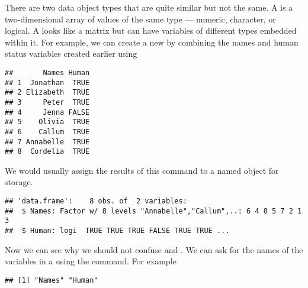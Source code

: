 There are two data object types that are quite similar but not the same. A  is a two-dimensional array of values of the same type --- numeric, character, or logical. A  looks like a matrix but can have variables of different types embedded within it. For example, we can create a new  by combining the names and human status variables created earlier using 
\begin{knitrout}
\color{fgcolor}\begin{kframe}
\begin{alltt}
\end{alltt}
\begin{verbatim}
##       Names Human
## 1  Jonathan  TRUE
## 2 Elizabeth  TRUE
## 3     Peter  TRUE
## 4     Jenna FALSE
## 5    Olivia  TRUE
## 6    Callum  TRUE
## 7 Annabelle  TRUE
## 8  Cordelia  TRUE
\end{verbatim}
\end{kframe}
\end{knitrout}
We would usually assign the results of this command to a named object for storage. 
\begin{knitrout}
\color{fgcolor}\begin{kframe}
\begin{alltt}
 \hlkwb{=} 
\end{alltt}
\begin{verbatim}
## 'data.frame':	8 obs. of  2 variables:
##  $ Names: Factor w/ 8 levels "Annabelle","Callum",..: 6 4 8 5 7 2 1 3
##  $ Human: logi  TRUE TRUE TRUE FALSE TRUE TRUE ...
\end{verbatim}
\end{kframe}
\end{knitrout}
 
Now we can see why we should not confuse  and . We can ask for the names of the variables in a  using the  command. For example 
\begin{knitrout}
\color{fgcolor}\begin{kframe}
\begin{alltt}
\end{alltt}
\begin{verbatim}
## [1] "Names" "Human"
\end{verbatim}
\end{kframe}
\end{knitrout}
 
